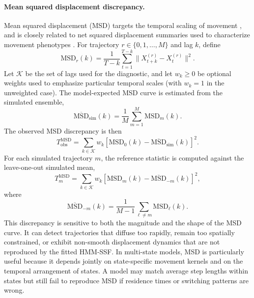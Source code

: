 \documentclass[11pt]{article}
\begin{document}
\paragraph{Mean squared displacement discrepancy.}
Mean squared displacement (MSD) targets the temporal scaling of movement
\citep{turchin1998}, and is closely related to net squared displacement
summaries used to characterize movement phenotypes \citep{bastilleRousseau2016}.
For trajectory $r \in \{0,1,\ldots,M\}$ and lag $k$, define
\begin{equation*}
  \mathrm{MSD}_r(k)
  =
  \frac{1}{T-k}\sum_{t=1}^{T-k}
  \|X_{t+k}^{(r)}-X_t^{(r)}\|^2 .
\end{equation*}
Let $\mathcal{K}$ be the set of lags used for the diagnostic, and let
$w_k \ge 0$ be optional weights used to emphasize particular temporal scales
(with $w_k=1$ in the unweighted case). The model-expected MSD curve is
estimated from the simulated ensemble,
\[
  \overline{\mathrm{MSD}}_{\mathrm{sim}}(k)
  =
  \frac{1}{M}\sum_{m=1}^{M}\mathrm{MSD}_m(k).
\]
The observed MSD discrepancy is then
\begin{equation}
  T_{\mathrm{obs}}^{\mathrm{MSD}}
  =
  \sum_{k \in \mathcal{K}}
  w_k
  \left[
    \mathrm{MSD}_0(k)
    -
    \overline{\mathrm{MSD}}_{\mathrm{sim}}(k)
  \right]^2 .
  \label{eq:msd-tobs}
\end{equation}
For each simulated trajectory $m$, the reference statistic is computed against
the leave-one-out simulated mean,
\begin{equation}
  T_m^{\mathrm{MSD}}
  =
  \sum_{k \in \mathcal{K}}
  w_k
  \left[
    \mathrm{MSD}_m(k)
    -
    \overline{\mathrm{MSD}}_{-m}(k)
  \right]^2 ,
  \label{eq:msd-tsim}
\end{equation}
where
\[
  \overline{\mathrm{MSD}}_{-m}(k)
  =
  \frac{1}{M-1}\sum_{\ell \ne m}\mathrm{MSD}_{\ell}(k).
\]
This discrepancy is sensitive to both the magnitude and the shape of the MSD
curve. It can detect trajectories that diffuse too rapidly, remain too
spatially constrained, or exhibit non-smooth displacement dynamics that are not
reproduced by the fitted HMM-SSF. In multi-state models, MSD is particularly
useful because it depends jointly on state-specific movement kernels and on the
temporal arrangement of states. A model may match average step lengths within
states but still fail to reproduce MSD if residence times or switching
patterns are wrong.
\end{document}
